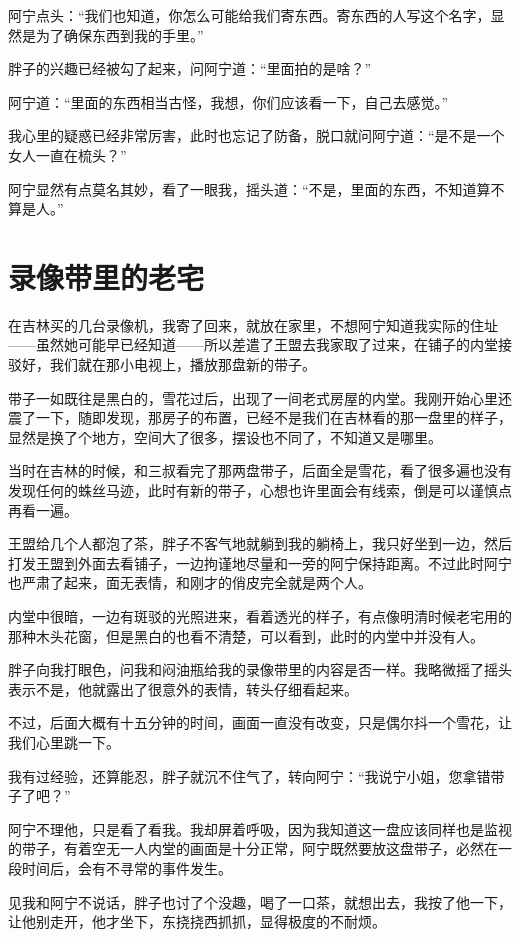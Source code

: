 阿宁点头：“我们也知道，你怎么可能给我们寄东西。寄东西的人写这个名字，显然是为了确保东西到我的手里。”

胖子的兴趣已经被勾了起来，问阿宁道：“里面拍的是啥？”

阿宁道：“里面的东西相当古怪，我想，你们应该看一下，自己去感觉。”

我心里的疑惑已经非常厉害，此时也忘记了防备，脱口就问阿宁道：“是不是一个女人一直在梳头？”

阿宁显然有点莫名其妙，看了一眼我，摇头道：“不是，里面的东西，不知道算不算是人。”

\chapter{录像带里的老宅}

在吉林买的几台录像机，我寄了回来，就放在家里，不想阿宁知道我实际的住址——虽然她可能早已经知道——所以差遣了王盟去我家取了过来，在铺子的内堂接驳好，我们就在那小电视上，播放那盘新的带子。

带子一如既往是黑白的，雪花过后，出现了一间老式房屋的内堂。我刚开始心里还震了一下，随即发现，那房子的布置，已经不是我们在吉林看的那一盘里的样子，显然是换了个地方，空间大了很多，摆设也不同了，不知道又是哪里。

当时在吉林的时候，和三叔看完了那两盘带子，后面全是雪花，看了很多遍也没有发现任何的蛛丝马迹，此时有新的带子，心想也许里面会有线索，倒是可以谨慎点再看一遍。

王盟给几个人都泡了茶，胖子不客气地就躺到我的躺椅上，我只好坐到一边，然后打发王盟到外面去看铺子，一边拘谨地尽量和一旁的阿宁保持距离。不过此时阿宁也严肃了起来，面无表情，和刚才的俏皮完全就是两个人。

内堂中很暗，一边有斑驳的光照进来，看着透光的样子，有点像明清时候老宅用的那种木头花窗，但是黑白的也看不清楚，可以看到，此时的内堂中并没有人。

胖子向我打眼色，问我和闷油瓶给我的录像带里的内容是否一样。我略微摇了摇头表示不是，他就露出了很意外的表情，转头仔细看起来。

不过，后面大概有十五分钟的时间，画面一直没有改变，只是偶尔抖一个雪花，让我们心里跳一下。

我有过经验，还算能忍，胖子就沉不住气了，转向阿宁：“我说宁小姐，您拿错带子了吧？”

阿宁不理他，只是看了看我。我却屏着呼吸，因为我知道这一盘应该同样也是监视的带子，有着空无一人内堂的画面是十分正常，阿宁既然要放这盘带子，必然在一段时间后，会有不寻常的事件发生。

见我和阿宁不说话，胖子也讨了个没趣，喝了一口茶，就想出去，我按了他一下，让他别走开，他才坐下，东挠挠西抓抓，显得极度的不耐烦。

